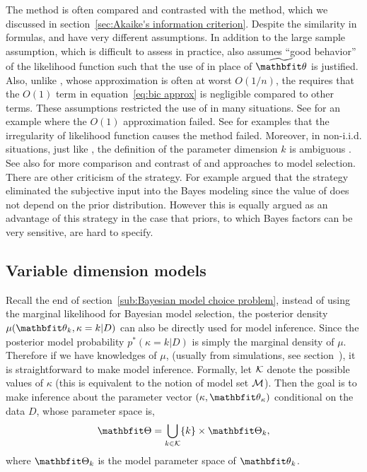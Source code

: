 \documentclass[11pt, hyper, bib, fontset=Minion]{marticle}
\begin{document}
The \bic method is often compared and contrasted with the \aic method, which
we discussed in section~\ref{sec:Akaike's information criterion}. Despite the
similarity in formulas, \aic and \bic have very different assumptions. In
addition to the large sample assumption, which is difficult to assess in
practice, \bic also assumes ``good behavior'' of the likelihood function such
that the use of \mle in place of $\tbth$ is justified. Also, unlike \aic,
whose approximation is often at worst $O(1/n)$, the \bic requires that the
$O(1)$ term in equation~\eqref{eq:bic approx} is negligible compared to other
terms. These assumptions restricted the use of \bic in many situations. See
\textcite{Gelfand:1994ux} for an example where the $O(1)$ approximation
failed. See \textcite{Berger:2001uy} for examples that the irregularity of
likelihood function causes the \bic method failed. Moreover, in non-i.i.d.
situations, just like \aic, the definition of the parameter dimension $k$ is
ambiguous \parencite{Spiegelhalter:1998uc, Kass:1995vb}. See also
\textcite[][chap.~5 and chap.~6]{Burnham:2002wc} for more comparison and
contrast of \aic and \bic approaches to model selection. There are other
criticism of the \bic strategy. For example
\textcite[][chap.~7]{Robert:2007tc} argued that the \bic strategy eliminated
the subjective input into the Bayes modeling since the value of \bic does not
depend on the prior distribution. However this is equally argued as an
advantage of this strategy in the case that priors, to which Bayes factors can
be very sensitive, are hard to specify.

\subsection{Variable dimension models}
\label{sub:Variable dimension models}

Recall the end of section~\ref{sub:Bayesian model choice problem}, instead of
using the marginal likelihood for Bayesian model selection, the posterior
density $\mu(\bth_k,\kappa=k|D)$ can also be directly used for model
inference. Since the posterior model probability $p^*(\kappa=k|D)$ is simply
the marginal density of $\mu$. Therefore if we have knowledges of $\mu$,
(usually from simulations, see section~), it is
straightforward to make model inference. Formally, let $\mathcal{K}$ denote the
possible values of $\kappa$ (this is equivalent to the notion of model set
$\mathcal{M}$). Then the goal is to make inference about the parameter vector
$(\kappa, \bth_{\kappa})$ conditional on the data $D$, whose parameter space
is,
\begin{equation}
  \bTh = \bigcup_{k\in\calK}\{k\}\times\bTh_k,
  \label{eq:variable dimension parameter space}
\end{equation}
where $\bTh_k$ is the model parameter space of $\bth_k$.
\end{document}
